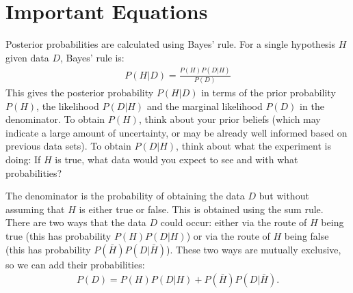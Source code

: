 \section{Important Equations}
Posterior probabilities are calculated using Bayes' rule. For a single
hypothesis $H$ given data $D$, Bayes' rule is:
\begin{eqnarray}
P(H|D) = \frac{P(H)P(D|H)}{P(D)}\label{eq:bayes1}
\end{eqnarray}
This gives the posterior probability $P(H|D)$ in terms of the prior probability
$P(H)$, the likelihood $P(D|H)$ and the marginal likelihood $P(D)$ in the
denominator. To obtain $P(H)$, think about your prior beliefs (which may
indicate a large amount of uncertainty, or may be already well informed based
on previous data sets). To obtain $P(D|H)$, think about what the experiment is
doing: If $H$ is true, what data would you expect to see and with what
probabilities?

The denominator is the probability of obtaining the data $D$ but without
assuming that $H$ is either true or false. This is obtained using the sum rule.
There are two ways that the data $D$ could occur: either via the route of $H$
being true (this has probability $P(H)P(D|H)$) or via the route of $H$ being
false (this has probability $P(\bar{H})P(D|\bar{H})$). These two ways are
mutually exclusive, so we can add their probabilities:
\begin{eqnarray}
P(D) = P(H)P(D|H) + P(\bar{H})P(D|\bar{H}).
\end{eqnarray}

